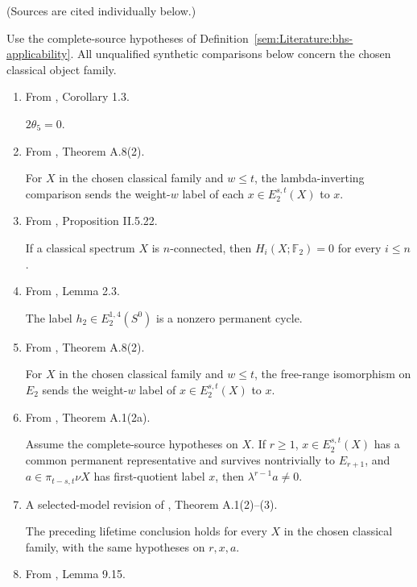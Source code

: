 \begin{theorem}
\label{frontier:Literature:d19d6b7e62ef}
(Sources are cited individually below.)\par{}

Use the complete-source hypotheses of Definition~\ref{sem:Literature:bhs-applicability}. All unqualified synthetic comparisons below concern the chosen classical object family.
\begin{enumerate}
\item From \cite{Xu}, Corollary 1.3.\par

$2\theta_5=0$.
\item From \cite{BHS}, Theorem A.8(2).\par

For $X$ in the chosen classical family and $w\le t$, the lambda-inverting comparison sends the weight-$w$ label of each $x\in E_2^{s,t}(X)$ to $x$.
\item From \cite{SchwedeSymmetricSpectra}, Proposition II.5.22.\par

If a classical spectrum $X$ is $n$-connected, then $H_i(X;\mathbb F_2)=0$ for every $i\le n$.
\item From \cite{Adams58}, Lemma 2.3.\par

The label $h_2\in E_2^{1,4}(S^0)$ is a nonzero permanent cycle.
\item From \cite{BHS}, Theorem A.8(2).\par

For $X$ in the chosen classical family and $w\le t$, the free-range isomorphism on $E_2$ sends the weight-$w$ label of $x\in E_2^{s,t}(X)$ to $x$.
\item From \cite{BHS}, Theorem A.1(2a).\par

Assume the complete-source hypotheses on $X$. If $r\ge1$, $x\in E_2^{s,t}(X)$ has a common permanent representative and survives nontrivially to $E_{r+1}$, and $a\in\pi_{t-s,t}\nu X$ has first-quotient label $x$, then $\lambda^{r-1}a\ne0$.
\item A selected-model revision of \cite{BHS}, Theorem A.1(2)--(3).\par

The preceding lifetime conclusion holds for every $X$ in the chosen classical family, with the same hypotheses on $r,x,a$.
\item From \cite{BHS}, Lemma 9.15.\par


\end{enumerate}
\end{theorem}
